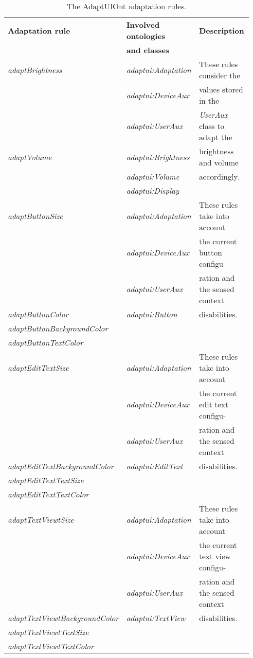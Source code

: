 \begin{table}
  \caption{The AdaptUIOnt adaptation rules.}
 \label{tbl:adaptation_rules}
\footnotesize
\centering
 \begin{tabular}{l l l}
  \hline 
  \textbf{Adaptation rule} 	& \textbf{Involved ontologies} 	& \textbf{Description} 		\\
				& \textbf{and classes} 		& 				\\
  \hline
  \textit{adaptBrightness}	& \textit{adaptui:Adaptation}	& These rules consider the  	\\
				& \textit{adaptui:DeviceAux}	& values stored in the 		\\
				& \textit{adaptui:UserAux}	& \textit{UserAux} class to adapt the \\
  \textit{adaptVolume}		& \textit{adaptui:Brightness}	& brightness and volume 	\\
				& \textit{adaptui:Volume}	& accordingly. 			\\
				& \textit{adaptui:Display}	& 				\\
  \hline 
  \textit{adaptButtonSize}	& \textit{adaptui:Adaptation}	& These rules take into account	\\
				& \textit{adaptui:DeviceAux}	& the current button configu-	\\
				& \textit{adaptui:UserAux}	& ration and the sensed context	\\
  \textit{adaptButtonColor}	& \textit{adaptui:Button}	& disabilities.			\\
  \textit{adaptButtonBackgroundColor}&				& 				\\
  \textit{adaptButtonTextColor}	& 				& 				\\

  \hline
  \textit{adaptEditTextSize}	& \textit{adaptui:Adaptation}	& These rules take into account	\\
				& \textit{adaptui:DeviceAux}	& the current edit text configu-\\
				& \textit{adaptui:UserAux}	& ration and the sensed	context	\\
  \textit{adaptEditTextBackgroundColor}	& \textit{adaptui:EditText}& disabilities.		\\
  \textit{adaptEditTextTextSize}& 				& 				\\
  \textit{adaptEditTextTextColor}&				& 				\\

  \hline 
  \textit{adaptTextViewtSize}	& \textit{adaptui:Adaptation}	& These rules take into account	\\
				& \textit{adaptui:DeviceAux}	& the current text view configu-\\
				& \textit{adaptui:UserAux}	& ration and the sensed	context	\\
  \textit{adaptTextViewtBackgroundColor}& \textit{adaptui:TextView}& disabilities.		\\
  \textit{adaptTextViewtTextSize}&				& 				\\
  \textit{adaptTextViewtTextColor}&				& 				\\
  \hline 
\end{tabular}
\end{table}

